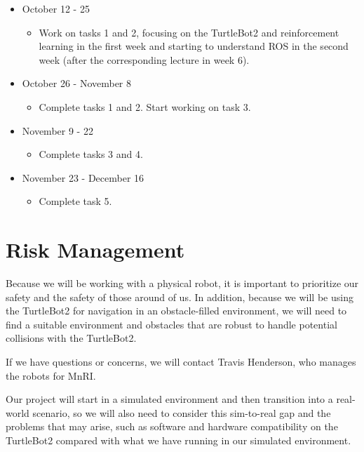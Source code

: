 \documentclass[conference]{IEEEtran}
\begin{document}
\begin{itemize}
    \item October 12 - 25

        \begin{itemize}
            \item Work on tasks 1 and 2, focusing on the TurtleBot2 and reinforcement learning in the first week and starting to understand ROS in the second week (after the corresponding lecture in week 6).
        \end{itemize}

    \item October 26 - November 8

        \begin{itemize}
            \item Complete tasks 1 and 2. Start working on task 3.
        \end{itemize}

    \item November 9 - 22

        \begin{itemize}
            \item Complete tasks 3 and 4.
        \end{itemize}

    \item November 23 - December 16

        \begin{itemize}
            \item Complete task 5.
        \end{itemize}
    
\end{itemize}

\section{Risk Management}

Because we will be working with a physical robot, it is important to prioritize our safety and the safety of those around of us. In addition, because we will be using the TurtleBot2 for navigation in an obstacle-filled environment, we will need to find a suitable environment and obstacles that are robust to handle potential collisions with the TurtleBot2.

If we have questions or concerns, we will contact Travis Henderson, who manages the robots for MnRI.

Our project will start in a simulated environment and then transition into a real-world scenario, so we will also need to consider this sim-to-real gap and the problems that may arise, such as software and hardware compatibility on the TurtleBot2 compared with what we have running in our simulated environment.
\end{document}
